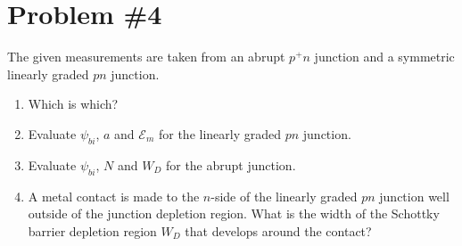 \documentclass{article}
\begin{document}
\pagebreak

\section*{Problem \#4}
The given measurements are taken from an abrupt $p^{+}n$ junction and a
symmetric linearly graded $pn$ junction. 
\begin{enumerate}
  \item{Which is which?}
  \item{Evaluate $\psi_{bi}$, $a$ and $\mathscr{E}_{m}$ for the
linearly graded $pn$ junction.}
  \item{Evaluate $\psi_{bi}$, $N$ and $W_D$ for the abrupt junction.}
  \item{A metal contact is made to the $n$-side of the linearly graded $pn$
  junction well outside of the junction depletion region. What is the width of
  the Schottky barrier depletion region $W_D$ that develops around the 
  contact?}
\end{enumerate}
\end{document}
